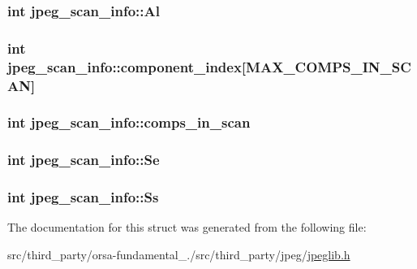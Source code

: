 \subsubsection[{Al}]{\setlength{\rightskip}{0pt plus 5cm}int jpeg\+\_\+scan\+\_\+info\+::\+Al}\label{structjpeg__scan__info_a89cc9e990977c50b2b2058e6b9526e67}
\hypertarget{structjpeg__scan__info_a041f1af60508517345c1b76c48ee6567}{}
\subsubsection[{component\+\_\+index}]{\setlength{\rightskip}{0pt plus 5cm}int jpeg\+\_\+scan\+\_\+info\+::component\+\_\+index\mbox{[}{\bf M\+A\+X\+\_\+\+C\+O\+M\+P\+S\+\_\+\+I\+N\+\_\+\+S\+C\+A\+N}\mbox{]}}\label{structjpeg__scan__info_a041f1af60508517345c1b76c48ee6567}
\hypertarget{structjpeg__scan__info_addd94bff3ee52f961cf6fda5ea86ddca}{}
\subsubsection[{comps\+\_\+in\+\_\+scan}]{\setlength{\rightskip}{0pt plus 5cm}int jpeg\+\_\+scan\+\_\+info\+::comps\+\_\+in\+\_\+scan}\label{structjpeg__scan__info_addd94bff3ee52f961cf6fda5ea86ddca}
\hypertarget{structjpeg__scan__info_a4eefb8be0412f78566862c28a20fb254}{}
\subsubsection[{Se}]{\setlength{\rightskip}{0pt plus 5cm}int jpeg\+\_\+scan\+\_\+info\+::\+Se}\label{structjpeg__scan__info_a4eefb8be0412f78566862c28a20fb254}
\hypertarget{structjpeg__scan__info_a33bc5abcded36ccd1b4c2ec94f6e2ba5}{}
\subsubsection[{Ss}]{\setlength{\rightskip}{0pt plus 5cm}int jpeg\+\_\+scan\+\_\+info\+::\+Ss}\label{structjpeg__scan__info_a33bc5abcded36ccd1b4c2ec94f6e2ba5}


The documentation for this struct was generated from the following file\+:\begin{DoxyCompactItemize}
\item 
src/third\+\_\+party/orsa-\/fundamental\+\_./src/third\+\_\+party/jpeg/\hyperlink{jpeglib_8h}{jpeglib.\+h}\end{DoxyCompactItemize}
